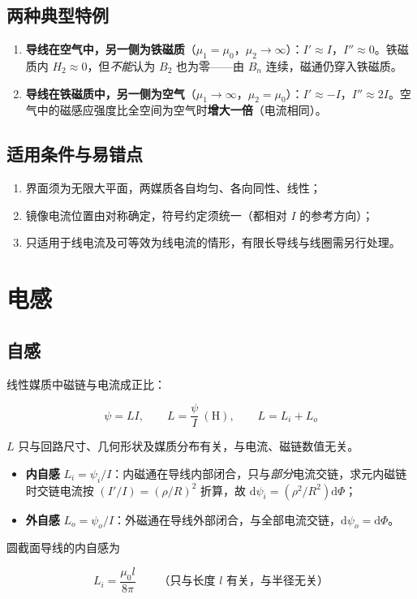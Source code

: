 \subsection{两种典型特例}
\begin{enumerate}
  \item \textbf{导线在空气中，另一侧为铁磁质}（$\mu_1=\mu_0$，$\mu_2\to\infty$）：$I'\approx I$，$I''\approx0$。铁磁质内 $H_2\approx0$，但\emph{不能}认为 $B_2$ 也为零——由 $B_n$ 连续，磁通仍穿入铁磁质。
  \item \textbf{导线在铁磁质中，另一侧为空气}（$\mu_1\to\infty$，$\mu_2=\mu_0$）：$I'\approx-I$，$I''\approx2I$。空气中的磁感应强度比全空间为空气时\textbf{增大一倍}（电流相同）。
\end{enumerate}

\subsection{适用条件与易错点}
\begin{enumerate}
  \item 界面须为无限大平面，两媒质各自均匀、各向同性、线性；
  \item 镜像电流位置由对称确定，符号约定须统一（都相对 $I$ 的参考方向）；
  \item 只适用于线电流及可等效为线电流的情形，有限长导线与线圈需另行处理。
\end{enumerate}


\section{电感}

\subsection{自感}
线性媒质中磁链与电流成正比：
\begin{formulaBox}
\[
\psi=LI,
\qquad
L=\frac{\psi}{I}\ (\mathrm{H}),
\qquad
L=L_i+L_o
\]
\end{formulaBox}
$L$ 只与回路尺寸、几何形状及媒质分布有关，与电流、磁链数值无关。
\begin{itemize}
  \item \textbf{内自感} $L_i=\psi_i/I$：内磁通在导线内部闭合，只与\emph{部分}电流交链，求元内磁链时交链电流按 $(I'/I)=(\rho/R)^2$ 折算，故 $\mathrm{d}\psi_i=(\rho^2/R^2)\mathrm{d}\Phi$；
  \item \textbf{外自感} $L_o=\psi_o/I$：外磁通在导线外部闭合，与全部电流交链，$\mathrm{d}\psi_o=\mathrm{d}\Phi$。
\end{itemize}
圆截面导线的内自感为
\begin{formulaBox}
\[
L_i=\frac{\mu_0 l}{8\pi}
\qquad\text{（只与长度 }l\text{ 有关，与半径无关）}
\]
\end{formulaBox}


